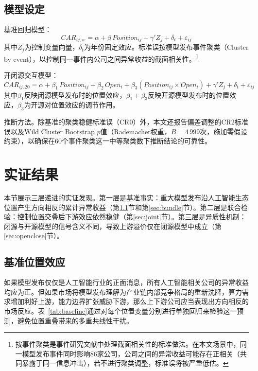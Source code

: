 \documentclass[11pt,fontset=fandol,a4paper]{ctexart}
\begin{document}
\subsection{模型设定}

基准回归模型：
\begin{equation}\label{eq:baseline}
CAR_{ij,w}=\alpha+\beta\, Position_{ij}+\gamma' Z_j+\delta_t+\varepsilon_{ij}
\end{equation}
其中$Z_j$为控制变量向量，$\delta_t$为年份固定效应。标准误按模型发布事件聚类（Cluster by event），以控制同一事件内公司之间异常收益的截面相关性。\footnote{按事件聚类是事件研究文献中处理截面相关性的标准做法。在本文场景中，同一模型发布事件同时影响86家公司，公司之间的异常收益可能存在正相关（共同暴露于同一信息冲击），若不进行聚类调整，标准误将被严重低估。}

开闭源交互模型：
\begin{equation}\label{eq:interaction}
CAR_{ij,20}=\alpha+\beta_1\, Position_{ij}+\beta_2\, Open_i+\beta_3(Position_{ij}\times Open_i)+\gamma' Z_j+\delta_t+\varepsilon_{ij}
\end{equation}
其中$\beta_1$反映闭源模型发布时的位置效应，$\beta_1+\beta_3$反映开源模型发布时的位置效应，$\beta_3$为开源对位置效应的调节作用。

推断方法。除基准的聚类稳健标准误（CR0）外，本文还报告偏差调整的CR2标准误以及Wild Cluster Bootstrap $p$值（Rademacher权重，$B=4\,999$次，施加零假设约束），以确保在60个事件聚类这一中等聚类数下推断结论的可靠性。


\section{实证结果}

本节展示三层递进的实证发现。第一层是基准事实：重大模型发布沿人工智能生态位置产生方向相反的累计异常收益（第\ref{sec:baseline}节和第\ref{sec:bundle}节）。第二层是联合检验：控制位置交叠后下游效应依然稳健（第\ref{sec:joint}节）。第三层是异质性机制：闭源与开源模型的信号含义不同，导致上游溢价仅在闭源模型中成立（第\ref{sec:openclose}节）。

\subsection{基准位置效应}\label{sec:baseline}

如果模型发布仅仅是人工智能行业的正面消息，所有人工智能相关公司的异常收益均应为正。但如果市场将模型发布理解为产业链内部竞争格局的重新洗牌，算力需求增加利好上游，能力边界扩张威胁下游，那么上下游公司应当表现出方向相反的市场反应。表~\ref{tab:baseline}通过对每个位置变量分别进行单独回归来检验这一预测，避免位置重叠带来的多重共线性干扰。
\end{document}
